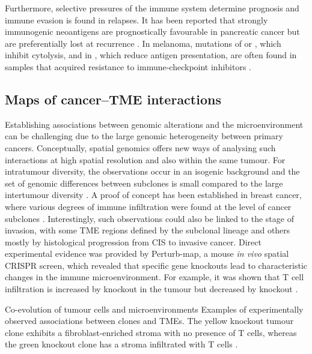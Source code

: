Furthermore, selective pressures of the immune system determine prognosis and immune evasion is found in relapses. It has been reported that strongly immunogenic neoantigens are prognostically favourable in pancreatic cancer \parencite{Balachandran2017-zq} but are preferentially lost at recurrence \parencite{Luksza2022-jj}. In melanoma, mutations of  or , which inhibit cytolysis, and in , which reduce antigen presentation, are often found in samples that acquired resistance to immune-checkpoint inhibitors \parencite{Sade-Feldman2017-mj,Zaretsky2016-rs}.

\subsection*{Maps of cancer–\acs{TME} interactions}
\label{sec:intro-cancer-tme-interactions}

Establishing associations between genomic alterations and the microenvironment can be challenging due to the large genomic heterogeneity between primary cancers. Conceptually, spatial genomics offers new ways of analysing such interactions at high spatial resolution and also within the same tumour. For intratumour diversity, the observations occur in an isogenic background and the set of genomic differences between subclones is small compared to the large intertumour diversity . A proof of concept has been established in breast cancer, where various degrees of immune infiltration were found at the level of cancer subclones \parencite{Lomakin2022-ks}. Interestingly, such observations could also be linked to the stage of invasion, with some \ac{TME} regions defined by the subclonal lineage and others mostly by histological progression from \acl{CIS} to invasive cancer. Direct experimental evidence was provided by Perturb-map, a mouse \textit{in vivo} spatial CRISPR screen, which revealed that specific gene knockouts lead to characteristic changes in the immune microenvironment. For example, it was shown that T cell infiltration is increased by  knockout in the tumour but decreased by  knockout \parencite{Dhainaut2022-nj} .

    {Co-evolution of tumour cells and microenvironments \parencite{Seferbekova2023-wg}}
    {Examples of experimentally observed associations between clones and \ac{TME}s. The yellow  knockout tumour clone exhibits a fibroblast-enriched stroma with no presence of T cells, whereas the green  knockout clone has a stroma infiltrated with T cells \parencite{Dhainaut2022-nj}.}

